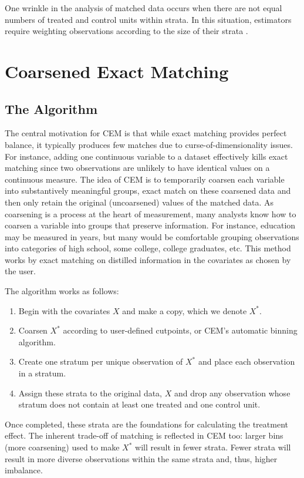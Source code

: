 \documentclass[11pt]{article}
\begin{document}
One wrinkle in the analysis of matched data occurs when there are not
equal numbers of treated and control units within strata. In this
situation, estimators require weighting observations according to the size
of their strata \citep{IacKinPor11c}.

\section{Coarsened Exact Matching} 

\subsection{The Algorithm}

The central motivation for CEM is that while exact matching provides
perfect balance, it typically produces few matches due to
curse-of-dimensionality issues. For instance, adding one continuous
variable to a dataset effectively kills exact matching since two
observations are unlikely to have identical values on a continuous
measure. The idea of CEM is to temporarily coarsen each variable into
substantively meaningful groups, exact match on these coarsened data
and then only retain the original (uncoarsened) values of the matched
data.  As coarsening is a process at the heart of measurement, many
analysts know how to coarsen a variable into groups that preserve
information. For instance, education may be measured in years, but
many would be comfortable grouping observations into categories of
high school, some college, college graduates, etc. This method works
by exact matching on distilled information in the covariates as chosen
by the user.

The algorithm works as follows:
\begin{enumerate}
\item Begin with the covariates $X$ and make a copy, which we denote
  $X^*$.
\item Coarsen $X^*$ according to user-defined cutpoints, or CEM's
  automatic binning algorithm.
\item Create one stratum per unique observation of $X^*$ and place each
  observation in a stratum.
\item Assign these strata to the original data, $X$ and drop any
  observation whose stratum does not contain at least one treated and
  one control unit.
\end{enumerate}

Once completed, these strata are the foundations for calculating the
treatment effect.  The inherent trade-off of matching is reflected in
CEM too: larger bins (more coarsening) used to make $X^*$ will result
in fewer strata. Fewer strata will result in more diverse observations
within the same strata and, thus, higher imbalance.
\end{document}
